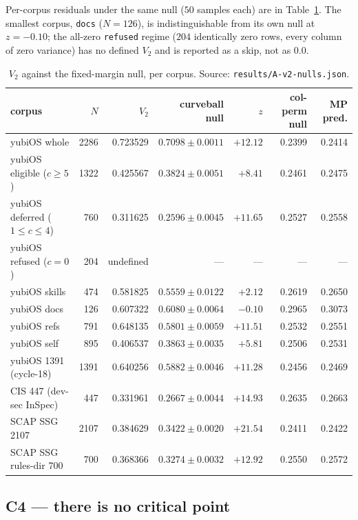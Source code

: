 \documentclass[11pt,a4paper]{article}
\theoremstyle{plain}
\theoremstyle{remark}
\theoremstyle{plain}
\begin{document}
Per-corpus residuals under the same null ($50$ samples each) are in Table~\ref{tab:percorpus}. The smallest corpus, \texttt{docs} ($N=126$), is indistinguishable from its own null at $z=-0.10$; the all-zero \texttt{refused} regime ($204$ identically zero rows, every column of zero variance) has no defined $V_2$ and is reported as a skip, not as $0.0$.

\begin{table}[h]
\centering
\small
\begin{tabular}{lrrrrrr}
\toprule
corpus & $N$ & $V_2$ & curveball null & $z$ & col-perm null & MP pred. \\
\midrule
yubiOS whole & 2286 & 0.723529 & $0.7098\pm0.0011$ & $+12.12$ & 0.2399 & 0.2414 \\
yubiOS eligible ($c\ge5$) & 1322 & 0.425567 & $0.3824\pm0.0051$ & $+8.41$ & 0.2461 & 0.2475 \\
yubiOS deferred ($1\le c\le4$) & 760 & 0.311625 & $0.2596\pm0.0045$ & $+11.65$ & 0.2527 & 0.2558 \\
yubiOS refused ($c=0$) & 204 & undefined & --- & --- & --- & --- \\
yubiOS skills & 474 & 0.581825 & $0.5559\pm0.0122$ & $+2.12$ & 0.2619 & 0.2650 \\
yubiOS docs & 126 & 0.607322 & $0.6080\pm0.0064$ & $\mathbf{-0.10}$ & 0.2965 & 0.3073 \\
yubiOS refs & 791 & 0.648135 & $0.5801\pm0.0059$ & $+11.51$ & 0.2532 & 0.2551 \\
yubiOS self & 895 & 0.406537 & $0.3863\pm0.0035$ & $+5.81$ & 0.2506 & 0.2531 \\
yubiOS 1391 (cycle-18) & 1391 & 0.640256 & $0.5882\pm0.0046$ & $+11.28$ & 0.2456 & 0.2469 \\
CIS 447 (dev-sec InSpec) & 447 & 0.331961 & $0.2667\pm0.0044$ & $+14.93$ & 0.2635 & 0.2663 \\
SCAP SSG 2107 & 2107 & 0.384629 & $0.3422\pm0.0020$ & $+21.54$ & 0.2411 & 0.2422 \\
SCAP SSG rules-dir 700 & 700 & 0.368366 & $0.3274\pm0.0032$ & $+12.92$ & 0.2550 & 0.2572 \\
\bottomrule
\end{tabular}
\caption{$V_2$ against the fixed-margin null, per corpus. Source: \texttt{results/A-v2-nulls.json}.}
\label{tab:percorpus}
\end{table}

\subsection{C4 --- there is no critical point}
\label{sec:c4}
\end{document}
